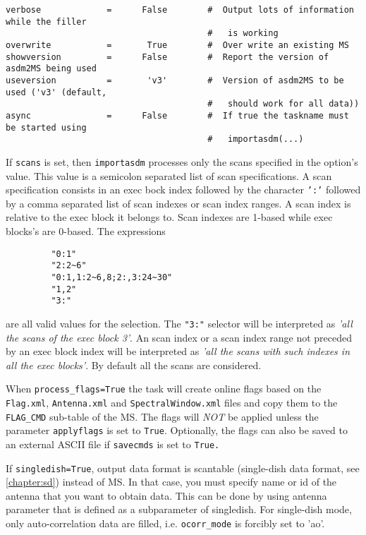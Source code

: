 \begin{verbatim}
verbose             =      False        #  Output lots of information while the filler
                                        #   is working
overwrite           =       True        #  Over write an existing MS
showversion         =      False        #  Report the version of asdm2MS being used
useversion          =       'v3'        #  Version of asdm2MS to be used ('v3' (default,
                                        #   should work for all data))
async               =      False        #  If true the taskname must be started using
                                        #   importasdm(...)

\end{verbatim}
\normalsize

If {\tt scans} is set, then {\tt importasdm} processes only the scans
specified in the option's value. This value is a semicolon separated
list of scan specifications. A scan specification consists in an exec
bock index followed by the character {\tt ':'} followed by a comma separated
list of scan indexes or scan index ranges. A scan index is relative to
the exec block it belongs to. Scan indexes are 1-based while exec
blocks's are 0-based. The expressions
\begin{verbatim}
         "0:1"
         "2:2~6"
         "0:1,1:2~6,8;2:,3:24~30"
         "1,2"
         "3:"
\end{verbatim}
are all valid values for the selection. The {\tt "3:"} selector will be interpreted
as {\it 'all the scans of the exec block 3'}. An scan index or a scan index
range not preceded by an exec block index will be interpreted as {\it 'all
the scans with such indexes in all the exec blocks'}.  By default all
the scans are considered.

When {\tt process\_flags=True} the task will create online flags based
on the {\tt Flag.xml}, {\tt Antenna.xml} and {\tt SpectralWindow.xml}
files and copy them to the {\tt FLAG\_CMD} sub-table of the MS. The
flags will {\it NOT} be applied unless the parameter {\tt applyflags}
is set to {\tt True}.  Optionally, the flags can also be saved to an
external ASCII file if {\tt savecmds} is set to {\tt True.}


If {\tt singledish=True}, output data format is scantable (single-dish data
format, see \ref{chapter:sd}) instead of MS. In that case, you must specify
name or id of the antenna that you want to obtain data. This can be
done by using antenna parameter that is defined as a subparameter of
singledish. For single-dish mode, only auto-correlation data are
filled, i.e. {\tt ocorr\_mode} is forcibly set to 'ao'. 

